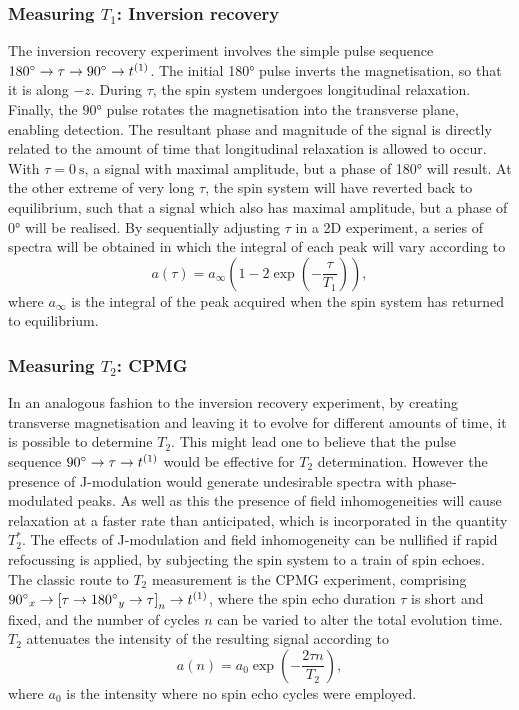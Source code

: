 \subsubsection{Measuring $T_1$: Inversion recovery}
The inversion recovery experiment involves the simple pulse sequence $\ang{180}
\rightarrow \tau \rightarrow \ang{90} \rightarrow t^{(1)}$. The initial
\ang{180} pulse inverts the magnetisation, so that it is along $-z$. During
$\tau$, the spin system undergoes longitudinal
relaxation. Finally, the \ang{90} pulse rotates the magnetisation into the
transverse plane, enabling detection. The resultant phase and magnitude of the
signal is directly related to the amount of time that longitudinal relaxation
is allowed to occur. With $\tau = \qty{0}{\second}$, a signal with
maximal amplitude, but a phase of \ang{180} will result. At the other extreme of
very long $\tau$, the spin system will have reverted
back to equilibrium, such that a signal which also has maximal amplitude, but a
phase of \ang{0} will be realised. By sequentially adjusting $\tau$ in a
\ac{2D} experiment, a series of spectra will be obtained in which the integral
of each peak will vary according to
\begin{equation}
    a\left(\tau\right) = a_{\infty} \left( 1 - 2 \exp\left( -\frac{\tau}{T_1}\right) \right),
\end{equation}
where $a_{\infty}$ is the integral of the peak acquired when the spin system
has returned to equilibrium.


\subsubsection{Measuring $T_2$: \acs{CPMG}}
In an analogous fashion to the inversion recovery experiment, by creating
transverse magnetisation and leaving it to evolve for different amounts of
time, it is possible to determine $T_2$. This might lead one to believe
that the pulse sequence $\ang{90} \rightarrow \tau \rightarrow t^{(1)}$ would be
effective for  $T_2$ determination. However the presence of J-modulation would
generate undesirable spectra with phase-modulated peaks. As well as this the presence of field inhomogeneities will cause relaxation at a faster rate than anticipated, which is incorporated in the quantity $T_2^*$. The effects of
J-modulation and field inhomogeneity can be nullified if rapid refocussing is
applied, by subjecting the spin system to a train of spin echoes. The classic
route to $T_2$ measurement is the \ac{CPMG}
experiment\cite{Carr1954,Meiboom1958}, comprising $\ang{90}_x \rightarrow
\left[ \tau \rightarrow \ang{180}_y \rightarrow \tau \right]_n \rightarrow
t^{(1)}$, where the spin echo duration $\tau$ is short and fixed, and the number
of cycles $n$ can be varied to alter the total evolution time. $T_2$ attenuates
the intensity of the resulting signal according to
\begin{equation}
    a(n) = a_0 \exp\left(-\frac{2 \tau n}{T_2}\right),
\end{equation}
where $a_0$ is the intensity where no spin echo cycles were employed.

